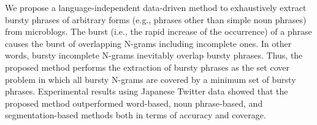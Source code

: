 We propose a language-independent data-driven method to exhaustively extract bursty phrases of arbitrary forms (e.g., phrases other than simple noun phrases) from microblogs. The burst (i.e., the rapid increase of the occurrence) of a phrase causes the burst of overlapping N-grams including incomplete ones. In other words, bursty incomplete N-grams inevitably overlap bursty phrases. Thus, the proposed method performs the extraction of bursty phrases as the set cover problem in which all bursty N-grams are covered by a minimum set of bursty phrases. Experimental results using Japanese Twitter data showed that the proposed method outperformed word-based, noun phrase-based, and segmentation-based methods both in terms of accuracy and coverage.

